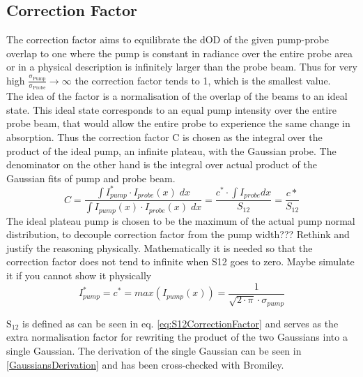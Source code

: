 \documentclass[twoside,openright]{scrreprt}
\begin{document}
\subsection{Correction Factor}
The correction factor aims to equilibrate the dOD of the given pump-probe overlap to one where the pump is constant in radiance over the entire probe area or in a physical description is infinitely larger than the probe beam.
Thus for very high $\mathrm{\frac{\sigma_{Pump}}{\sigma_{Probe}} \rightarrow \infty}$ the correction factor tends to 1, which is the smallest value.\\
The idea of the factor is a normalisation of the overlap of the beams to an ideal state. This ideal state corresponds to an equal pump intensity over the entire probe beam, that would allow the entire probe to experience the same change in absorption. Thus the correction factor C is chosen as the integral over the product of the ideal pump, an infinite plateau, with the Gaussian probe. The denominator on the other hand is the integral over actual product of the Gaussian fits of pump and probe beam.
\begin{equation}\label{CorrFactorGaussians}
C = \dfrac{\int I_{pump}^*\cdot I_{probe}(x) \;dx}{\int I_{pump}(x)\cdot I_{probe}(x) \; dx} = \dfrac{c^*\cdot \int I_{probe} dx}{S_{12}} = \dfrac{c*}{S_{12}}
\end{equation}
The ideal plateau pump is chosen to be the maximum of the actual pump normal distribution, to decouple correction factor from the pump width??? Rethink and justify the reasoning physically. Mathematically it is needed so that the correction factor does not tend to infinite when S12 goes to zero. Maybe simulate it if you cannot show it physically
\begin{equation*}
I_{pump}^* = c^* = max(I_{pump}(x)) = \frac{1}{\sqrt{2\cdot\pi}\cdot\sigma_{pump}}
\end{equation*}

$\mathrm{S_{12}}$ is defined as can be seen in eq. \ref{eq:S12CorrectionFactor} and serves as the extra normalisation factor for rewriting the product of the two Gaussians into a single Gaussian. The derivation of the single Gaussian can be seen in \ref{GaussiansDerivation} and has been cross-checked with Bromiley.\cite{Bromiley2014}
\end{document}
